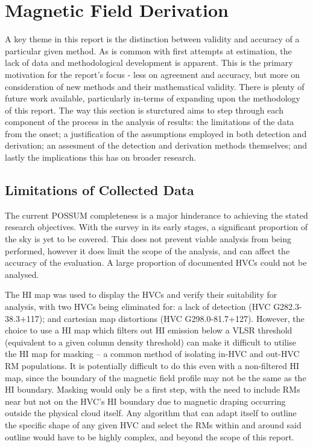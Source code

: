 \section{Magnetic Field Derivation}
\label{sec:mag_disc}

A key theme in this report is the distinction between validity and accuracy of a particular given method. As is common with first attempts at estimation, the lack of data and methodological development is apparent. This is the primary motivation for the report's focus - less on agreement and accuracy, but more on consideration of new methods and their mathematical validity. There is plenty of future work available, particularly in-terms of expanding upon the methodology of this report. The way this section is sturctured aims to step through each component of the process in the analysis of results: the limitations of the data from the onset; a justification of the assumptions employed in both detection and derivation; an assesment of the detection and derivation methods themselves; and lastly the implications this has on broader research.

\subsection{Limitations of Collected Data}
\label{ssec:B1}

The current POSSUM completeness is a major hinderance to achieving the stated research objectives. With the survey in its early stages, a significant proportion of the sky is yet to be covered. This does not prevent viable analysis from being performed, however it does limit the scope of the analysis, and can affect the accuracy of the evaluation. A large proportion of documented HVCs could not be analysed.


The HI \cite{ID6} map was used to display the HVCs and verify their suitability for analysis, with two HVCs being eliminated for: a lack of detection (HVC G282.3-38.3+117); and cartesian map distortions (HVC G298.0-81.7+127). However, the choice to use a HI map which filters out HI emission below a VLSR threshold (equivalent to a given column density threshold) can make it difficult to utilise the HI map for masking – a common method of isolating in-HVC and out-HVC RM populations. It is potentially difficult to do this even with a non-filtered HI map, since the boundary of the magnetic field profile may not be the same as the HI boundary. Masking would only be a first step, with the need to include RMs near but not on the HVC's HI boundary due to magnetic draping occurring outside the physical cloud itself. Any algorithm that can adapt itself to outline the specific shape of any given HVC and select the RMs within and around said outline would have to be highly complex, and beyond the scope of this report.


